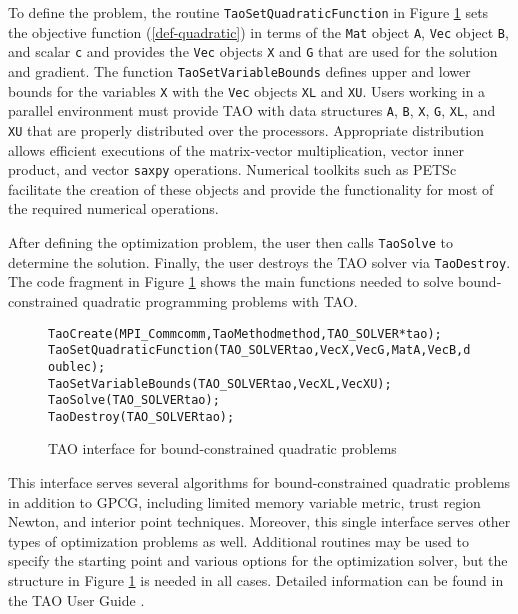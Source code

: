To define the problem, the routine 
\texttt{TaoSetQuadraticFunction} in Figure \ref{tao_interface}
sets the objective
function (\ref{def-quadratic}) in terms of the \texttt{Mat} object \texttt{A},
\texttt{Vec} object \texttt{B}, and scalar \texttt{c}
and provides the \texttt{Vec} objects \texttt{X} and \texttt{G} 
that are used for the solution and gradient.
The function
\texttt{TaoSetVariableBounds} defines upper and lower bounds for the variables
\texttt{X} with the \texttt{Vec} objects \texttt{XL} and \texttt{XU}.
Users working in a parallel environment must provide TAO with data structures
\texttt{A}, \texttt{B}, \texttt{X}, \texttt{G}, \texttt{XL}, and \texttt{XU} 
that are properly distributed over the processors.  
Appropriate distribution allows efficient executions of the 
matrix-vector multiplication, vector inner product, and vector \texttt{saxpy}
operations.
Numerical toolkits such as PETSc facilitate the creation of these objects and
provide the functionality for most of the required numerical operations.

After defining
the optimization problem, the user then calls \texttt{TaoSolve} to
determine the solution.  Finally, the user destroys the TAO solver via
\texttt{TaoDestroy}.  The code fragment in Figure \ref{tao_interface}
shows the main functions needed to solve bound-constrained quadratic
programming problems with TAO.

\begin{figure}[htb]
\medskip
\begin{alltt}
  TaoCreate(MPI_Comm comm,TaoMethod method,TAO_SOLVER *tao); 
  TaoSetQuadraticFunction(TAO_SOLVER tao,Vec X,Vec G,Mat A,Vec B,double c);
  TaoSetVariableBounds(TAO_SOLVER tao,Vec XL,Vec XU);
  TaoSolve(TAO_SOLVER tao);
  TaoDestroy(TAO_SOLVER tao);
\end{alltt}
\caption{TAO interface for bound-constrained quadratic problems\label{tao_interface}}
\end{figure}

This interface serves
several algorithms for bound-constrained quadratic problems in
addition to GPCG, including limited memory variable metric, trust
region Newton, and interior point techniques.  Moreover, this single
interface serves other types of optimization problems as well.
Additional routines may be used to specify the starting point
and various options for the optimization solver,
but the structure in  Figure \ref{tao_interface} is needed in all cases.
Detailed information can be found
in the TAO User Guide \cite{tao-user-ref}.


